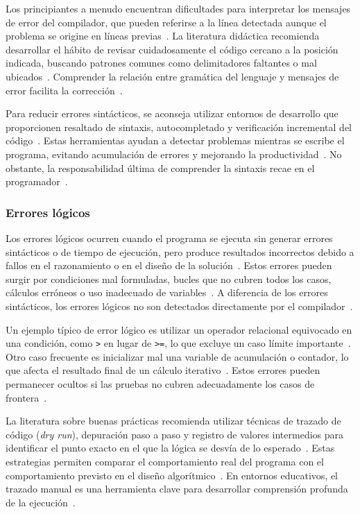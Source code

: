\documentclass[12pt,twoside]{book}
\begin{document}
						Los principiantes a menudo encuentran dificultades para interpretar los mensajes de error del compilador, que pueden referirse a la línea detectada aunque el problema se origine en líneas previas~\cite{Gaddis2022Starting}. La literatura didáctica recomienda desarrollar el hábito de revisar cuidadosamente el código cercano a la posición indicada, buscando patrones comunes como delimitadores faltantes o mal ubicados~\cite{Sommerville2015Software}. Comprender la relación entre gramática del lenguaje y mensajes de error facilita la corrección~\cite{Pressman2019Software}.
						
						Para reducir errores sintácticos, se aconseja utilizar entornos de desarrollo que proporcionen resaltado de sintaxis, autocompletado y verificación incremental del código~\cite{Stallings2021Computer}. Estas herramientas ayudan a detectar problemas mientras se escribe el programa, evitando acumulación de errores y mejorando la productividad~\cite{Pressman2019Software}. No obstante, la responsabilidad última de comprender la sintaxis recae en el programador~\cite{Gaddis2022Starting}.
				
					\subsubsection{Errores lógicos}
						Los errores lógicos ocurren cuando el programa se ejecuta sin generar errores sintácticos o de tiempo de ejecución, pero produce resultados incorrectos debido a fallos en el razonamiento o en el diseño de la solución~\cite{Gaddis2022Starting}. Estos errores pueden surgir por condiciones mal formuladas, bucles que no cubren todos los casos, cálculos erróneos o uso inadecuado de variables~\cite{Pressman2019Software}. A diferencia de los errores sintácticos, los errores lógicos no son detectados directamente por el compilador~\cite{Sommerville2015Software}.
						
						Un ejemplo típico de error lógico es utilizar un operador relacional equivocado en una condición, como \texttt{>} en lugar de \texttt{>=}, lo que excluye un caso límite importante~\cite{Gaddis2022Starting}. Otro caso frecuente es inicializar mal una variable de acumulación o contador, lo que afecta el resultado final de un cálculo iterativo~\cite{Sommerville2015Software}. Estos errores pueden permanecer ocultos si las pruebas no cubren adecuadamente los casos de frontera~\cite{Pressman2019Software}.
						
						La literatura sobre buenas prácticas recomienda utilizar técnicas de trazado de código (\emph{dry run}), depuración paso a paso y registro de valores intermedios para identificar el punto exacto en el que la lógica se desvía de lo esperado~\cite{Gaddis2022Starting}. Estas estrategias permiten comparar el comportamiento real del programa con el comportamiento previsto en el diseño algorítmico~\cite{Pressman2019Software}. En entornos educativos, el trazado manual es una herramienta clave para desarrollar comprensión profunda de la ejecución~\cite{Sommerville2015Software}.
						
\end{document}
